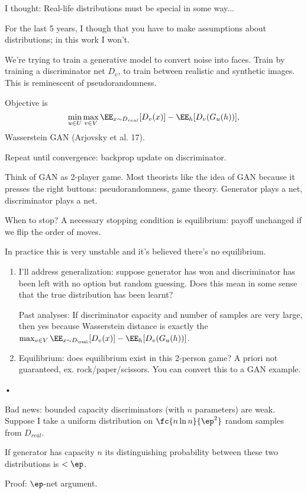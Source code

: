 I thought: Real-life distributions must be special in some way... %

For the last 5 years, I though that you have to make assumptions about distributions; in this work I won't.

We're trying to train a generative model to convert noise into faces. Train by training a discriminator net $D_v$, to train between realistic and synthetic images. This is reminescent of pseudorandomness. %

Objective is 
$$
\min_{u\in U}\max_{v\in V} \EE_{x\sim D_{real}} [D_v(x)] - \EE_h [D_v(G_u(h))],
$$
Wasserstein GAN (Arjovsky et al. 17). 

Repeat until convergence: backprop update on discriminator. %

Think of GAN as 2-player game. Most theorists like the idea of GAN because it presses the  right buttons: pseudorandomness, game theory.
Generator plays a net, discriminator plays a net.

When to stop? A necessary stopping condition is equilibrium: payoff unchanged if we flip the order of moves.

In practice this is very unstable and it's believed there's no equilibrium.
\begin{enumerate}
\item
I'll address generalization: suppose generator has won and discriminator has been left with no option but random guessing. Does this mean in some sense that the true distribution has been learnt?

Past analyses: If discriminator capacity and number of samples are very large, then yes because Wasserstein distance is exactly the $\max_{v\in V} \EE_{x\sim D_{\real}} [D_v(x)] - \EE_h[D_v(G_u(h))]$.
\item
Equilibrium: does equilibrium exist in this 2-person game? A priori not guaranteed, ex. rock/paper/scissors.
You can convert this to a GAN example.
\end{enumerate}•

Bad news: bounded capacity discriminators (with $n$ parameters) are weak.  
Suppose I take a uniform distribution on $\fc{n\ln n}{\ep^2}$ random samples from $D_{real}$. 

\begin{thm}
If generator has capacity $n$ its distinguishing probability between these two distributions is $<\ep$.
\end{thm}
Proof: $\ep$-net argument.

